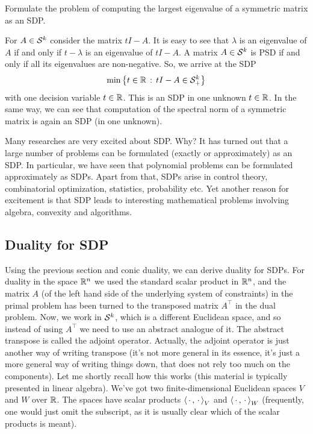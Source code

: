 \begin{exercise}
	Formulate the problem of computing the largest eigenvalue of a symmetric matrix as an SDP. 
\end{exercise}
\begin{solution}
	For $A \in \mathcal{S}^k$ consider the matrix $t I - A$. It is easy to see that $\lambda$ is an eigenvalue of $A$ if and only if $t-\lambda$ is an eigenvalue of $t I - A$. A matrix $A \in \mathcal{S}^k$ is PSD if and only if all its eigenvalues are non-negative. So, we arrive at the SDP
\begin{align*}
	\min \left\{ t \in \mathbb{R} \,:\,  t I - A \in \mathcal{S}_+^k \right\}
\end{align*}
with one decision variable $t \in \mathbb{R}$.
This is an SDP in one unknown $t \in \mathbb{R}$. 
In the same way, we can see that computation of the spectral norm of a symmetric matrix is again an SDP (in one unknown).
\end{solution}

\begin{remark}
	Many researches are very excited about SDP. Why? It has turned out that a large number of problems can be formulated (exactly or approximately) as an SDP. In particular, we have seen that polynomial problems can be formulated approximately as SDPs. Apart from that, SDPs arise in control theory, combinatorial optimization, statistics, probability etc. Yet another reason for excitement is that SDP leads to interesting mathematical problems involving algebra, convexity and algorithms. 
\end{remark}

\subsection{Duality for SDP}

Using the previous section and conic duality, we can derive duality for SDPs. For duality in the space $\mathbb{R}^n$ we used the standard scalar product in $\mathbb{R}^n$, and the matrix $A$ (of the left hand side of the underlying system of constraints) in the primal problem has been turned to the transposed matrix $A^\top$ in the dual problem. Now, we work in $\mathcal{S}^k$, which is a different Euclidean space, and so instead of using $A^\top$ we need to use an abstract analogue of it. The abstract transpose is called the adjoint operator. Actually, the adjoint operator is just another way of writing transpose (it's not more general in its essence, it's just a more general way of writing things down, that does not rely too much on the components). Let me shortly recall how this works (this material is typically presented in linear algebra). We've got two finite-dimensional Euclidean spaces $V$ and $W$ over $\mathbb{R}$. The spaces have scalar products  $\left\langle \, \cdot \, , \, \cdot \, \right\rangle_V$ and $\left\langle \, \cdot \, , \, \cdot \, \right\rangle_W$ (frequently, one would just omit the subscript, as it is usually clear which of the scalar products is meant). 


